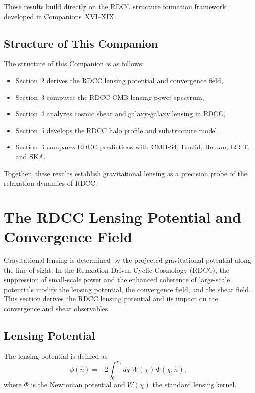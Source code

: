 \documentclass[11pt,a4paper]{article}
\begin{document}
These results build directly on the RDCC structure formation framework developed in
Companions~XVI–XIX.

\subsection{Structure of This Companion}

The structure of this Companion is as follows:
\begin{itemize}
\item Section~2 derives the RDCC lensing potential and convergence field,
\item Section~3 computes the RDCC CMB lensing power spectrum,
\item Section~4 analyzes cosmic shear and galaxy-galaxy lensing in RDCC,
\item Section~5 develops the RDCC halo profile and substructure model,
\item Section~6 compares RDCC predictions with CMB-S4, Euclid, Roman, LSST, and SKA.
\end{itemize}

Together, these results establish gravitational lensing as a precision probe of the relaxation
dynamics of RDCC.

\section{The RDCC Lensing Potential and Convergence Field}

Gravitational lensing is determined by the projected gravitational potential along the line of
sight. In the Relaxation-Driven Cyclic Cosmology (RDCC), the suppression of small-scale
power and the enhanced coherence of large-scale potentials modify the lensing potential, the
convergence field, and the shear field. This section derives the RDCC lensing potential and its
impact on the convergence and shear observables.

\subsection{Lensing Potential}

The lensing potential is defined as
\begin{equation}
\phi(\hat{n})
=
-2
\int_{0}^{\chi_{*}}
d\chi\,
W(\chi)\,
\Phi(\chi,\hat{n}),
\end{equation}
where $\Phi$ is the Newtonian potential and $W(\chi)$ the standard lensing kernel.
\end{document}
